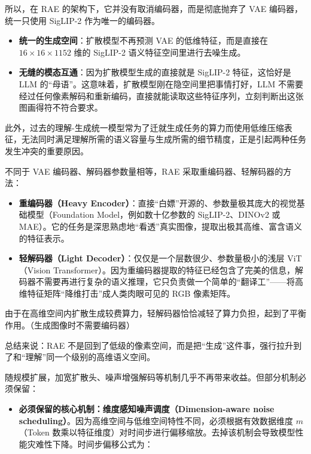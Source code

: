 所以，在 RAE 的架构下，它并没有取消编码器，而是彻底抛弃了 VAE 编码器，统一只使用 SigLIP-2 作为唯一的编码器。

\begin{itemize}
\tightlist
\item
  \textbf{统一的生成空间}：扩散模型不再预测 VAE 的低维特征，而是直接在 \(16\times16\times1152\) 维的 SigLIP-2 语义特征空间里进行去噪生成。
\item
  \textbf{无缝的模态互通}：因为扩散模型生成的直接就是 SigLIP-2 特征，这恰好是 LLM 的``母语''。这意味着，扩散模型刚在隐空间里把事情打好，LLM 不需要经过任何像素解码和重新编码，直接就能读取这些特征序列，立刻判断出这张图画得符不符合要求。
\end{itemize}

此外，过去的理解-生成统一模型常为了迁就生成任务的算力而使用低维压缩表征，无法同时满足理解所需的语义容量与生成所需的细节精度，正是引起两种任务发生冲突的重要原因。

不同于 VAE 编码器、解码器参数量相等，RAE 采取重编码器、轻解码器的方法：

\begin{itemize}
\tightlist
\item
  \textbf{重编码器（Heavy Encoder）}：直接``白嫖''开源的、参数量极其庞大的视觉基础模型（Foundation Model，例如数十亿参数的 SigLIP-2、DINOv2 或 MAE）。它的任务是深思熟虑地``看透''真实图像，提取出极其高维、富含语义的特征表示。
\item
  \textbf{轻解码器（Light Decoder）}：仅仅是一个层数很少、参数量极小的浅层 ViT（Vision Transformer）。因为重编码器提取的特征已经包含了完美的信息，解码器不需要再进行复杂的语义推理，它只负责做一个简单的``翻译工''------将高维特征矩阵``降维打击''成人类肉眼可见的 RGB 像素矩阵。
\end{itemize}

由于在高维空间内扩散生成较费算力，轻解码器恰恰减轻了算力负担，起到了平衡作用。（生成图像时不需要编码器）

总结来说：RAE 不是回到了低级的像素空间，而是把``生成''这件事，强行拉升到了和``理解''同一个级别的高维语义空间。

随规模扩展，加宽扩散头、噪声增强解码等机制几乎不再带来收益。但部分机制必须保留：

\begin{itemize}
\tightlist
\item
  \textbf{必须保留的核心机制：维度感知噪声调度（Dimension-aware noise scheduling）}。因为高维空间与低维空间特性不同，必须根据有效数据维度 \(m\)（Token 数乘以特征维度）对时间步进行偏移缩放。去掉该机制会导致模型性能灾难性下降。时间步偏移公式为：
\end{itemize}

